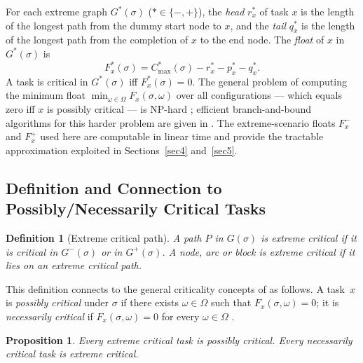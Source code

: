 \documentclass[preprint,12pt]{elsarticle}
\newtheorem{proposition}{Proposition}
\newtheorem{definition}{Definition}
\begin{document}
For each extreme graph $G^{*}(\sigma)$ ($* \in \{-,+\}$), the \emph{head} $r_{x}^{*}$ of task $x$ is the length of the longest path from the dummy start node to $x$, and the \emph{tail} $q_{x}^{*}$ is the length of the longest path from the completion of $x$ to the end node. The \emph{float} of $x$ in $G^{*}(\sigma)$ is
\begin{equation}
F_{x}^{*}(\sigma) = C^{*}_{\max}(\sigma) - r_{x}^{*} - p_{x}^{*} - q_{x}^{*}.
\end{equation}
A task is critical in $G^{*}(\sigma)$ iff $F_{x}^{*}(\sigma) = 0$. The general problem of computing the minimum float $\min_{\omega\in\Omega} F_x(\sigma,\omega)$ over all configurations --- which equals zero iff $x$ is possibly critical --- is NP-hard \cite{Fortin2010,Dubois2005}; efficient branch-and-bound algorithms for this harder problem are given in \cite{Garaix2013}. The extreme-scenario floats $F_x^-$ and $F_x^+$ used here are computable in linear time and provide the tractable approximation exploited in Sections~\ref{sec4} and~\ref{sec5}.

\subsection{Definition and Connection to Possibly/Necessarily Critical Tasks}
\label{sec3.3}

\begin{definition}[Extreme critical path]
\label{def1}
A path $P$ in $G(\sigma)$ is \emph{extreme critical} if it is critical in $G^-(\sigma)$ or in $G^+(\sigma)$. A node, arc or block is extreme critical if it lies on an extreme critical path.
\end{definition}

This definition connects to the general criticality concepts of \cite{Fortin2010,Artigues2015} as follows. A task~$x$ is \emph{possibly critical} under $\sigma$ if there exists $\omega \in \Omega$ such that $F_x(\sigma,\omega)=0$; it is \emph{necessarily critical} if $F_x(\sigma,\omega)=0$ for every $\omega \in \Omega$ \cite{Fortin2010,Artigues2015}.

\begin{proposition}
\label{prop1}
Every extreme critical task is possibly critical. Every necessarily critical task is extreme critical.
\end{proposition}
\end{document}
